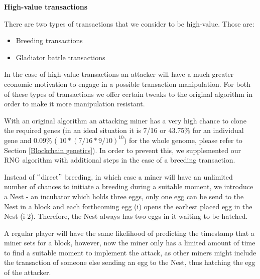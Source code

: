 \documentclass[12pt]{article}
\begin{document}
\textbf{High-value transactions}\par

There are two types of transactions that we consider to be high-value. Those are:\par

\begin{itemize}
	\item Breeding transactions\par

	\item Gladiator battle transactions
\end{itemize}\par

\begin{justify}
In the case of high-value transactions an attacker will have a much greater economic motivation to engage in a possible transaction manipulation. For both of these types of transactions we offer certain tweaks to the original algorithm in order to make it more manipulation resistant.
\end{justify}\par

\begin{justify}
With an original algorithm an attacking miner has a very high chance to clone the required genes (in an ideal situation it is 7/16 or 43.75$\%$  for an individual gene and 0.09$\%$  ( $10*(7/16*9/10)^{10}$) for the whole genome, please refer to Section  \ref{Blockchain genetics}). In order to prevent this, we supplemented our RNG algorithm with additional steps in the case of a breeding transaction.
\end{justify}\par

\begin{justify}
Instead of $``$direct$"$  breeding, in which case a miner will have an unlimited number of chances to initiate a breeding during a suitable moment, we introduce a Nest - an incubator which holds three eggs, only one egg can be send to the Nest in a block and each forthcoming egg (i) opens the earliest placed egg in the Nest (i-2). Therefore, the Nest always has two eggs in it waiting to be hatched.
\end{justify}\par

\begin{justify}
A regular player will have the same likelihood of predicting the timestamp that a miner sets for a block, however, now the miner only has a limited amount of time to find a suitable moment to implement the attack, as other miners might include the transaction of someone else sending an egg to the Nest, thus hatching the egg of the attacker.
\end{justify}\par
\end{document}
